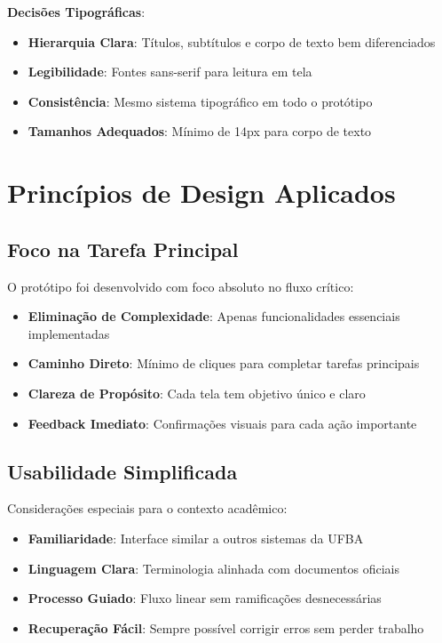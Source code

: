 \documentclass[12pt, a4paper]{report}
\begin{document}
\textbf{Decisões Tipográficas}:
\begin{itemize}
    \item \textbf{Hierarquia Clara}: Títulos, subtítulos e corpo de texto bem diferenciados
    \item \textbf{Legibilidade}: Fontes sans-serif para leitura em tela
    \item \textbf{Consistência}: Mesmo sistema tipográfico em todo o protótipo
    \item \textbf{Tamanhos Adequados}: Mínimo de 14px para corpo de texto
\end{itemize}

\section{Princípios de Design Aplicados}

\subsection{Foco na Tarefa Principal}

O protótipo foi desenvolvido com foco absoluto no fluxo crítico:

\begin{itemize}
    \item \textbf{Eliminação de Complexidade}: Apenas funcionalidades essenciais implementadas
    \item \textbf{Caminho Direto}: Mínimo de cliques para completar tarefas principais
    \item \textbf{Clareza de Propósito}: Cada tela tem objetivo único e claro
    \item \textbf{Feedback Imediato}: Confirmações visuais para cada ação importante
\end{itemize}

\subsection{Usabilidade Simplificada}

Considerações especiais para o contexto acadêmico:

\begin{itemize}
    \item \textbf{Familiaridade}: Interface similar a outros sistemas da UFBA
    \item \textbf{Linguagem Clara}: Terminologia alinhada com documentos oficiais
    \item \textbf{Processo Guiado}: Fluxo linear sem ramificações desnecessárias
    \item \textbf{Recuperação Fácil}: Sempre possível corrigir erros sem perder trabalho
\end{itemize}
\end{document}
